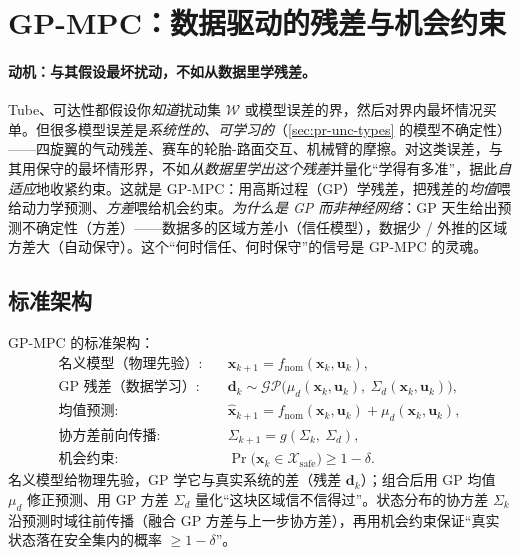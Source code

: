 \section{GP-MPC：数据驱动的残差与机会约束}
\label{sec:pr-gpmpc}

\paragraph{动机：与其假设最坏扰动，不如从数据里学残差。}
Tube、可达性都假设你\emph{知道}扰动集 $\mathcal{W}$ 或模型误差的界，然后对界内最坏情况买单。但很多模型误差是\emph{系统性的、可学习的}（\cref{sec:pr-unc-types} 的模型不确定性）——四旋翼的气动残差、赛车的轮胎-路面交互、机械臂的摩擦。对这类误差，与其用保守的最坏情形界，不如\emph{从数据里学出这个残差}并量化“学得有多准”，据此\emph{自适应}地收紧约束。这就是 GP-MPC：用高斯过程（GP）学残差，把残差的\emph{均值}喂给动力学预测、\emph{方差}喂给机会约束\cite{hewing2020gpmpc}。\emph{为什么是 GP 而非神经网络}：GP 天生给出预测不确定性（方差）——数据多的区域方差小（信任模型），数据少 / 外推的区域方差大（自动保守）。这个“何时信任、何时保守”的信号是 GP-MPC 的灵魂。

\subsection{标准架构}
\label{sec:pr-gpmpc-arch}

GP-MPC 的标准架构\cite{hewing2020gpmpc}：
\begin{equation}
\begin{aligned}
\text{名义模型（物理先验）:}\quad & \mathbf{x}_{k+1}=f_{\mathrm{nom}}(\mathbf{x}_k,\mathbf{u}_k),\\
\text{GP 残差（数据学习）:}\quad & \mathbf{d}_k\sim\mathcal{GP}\big(\mu_d(\mathbf{x}_k,\mathbf{u}_k),\ \Sigma_d(\mathbf{x}_k,\mathbf{u}_k)\big),\\
\text{均值预测:}\quad & \hat{\mathbf{x}}_{k+1}=f_{\mathrm{nom}}(\mathbf{x}_k,\mathbf{u}_k)+\mu_d(\mathbf{x}_k,\mathbf{u}_k),\\
\text{协方差前向传播:}\quad & \Sigma_{k+1}=g(\Sigma_k,\ \Sigma_d),\\
\text{机会约束:}\quad & \Pr\!\big(\mathbf{x}_k\in\mathcal{X}_{\mathrm{safe}}\big)\ge 1-\delta.
\end{aligned}
\label{eq:pr-gpmpc}
\end{equation}
名义模型给物理先验，GP 学它与真实系统的差（残差 $\mathbf{d}_k$）；组合后用 GP 均值 $\mu_d$ 修正预测、用 GP 方差 $\Sigma_d$ 量化“这块区域信不信得过”。状态分布的协方差 $\Sigma_k$ 沿预测时域往前传播（融合 GP 方差与上一步协方差），再用机会约束保证“真实状态落在安全集内的概率 $\ge 1-\delta$”。


